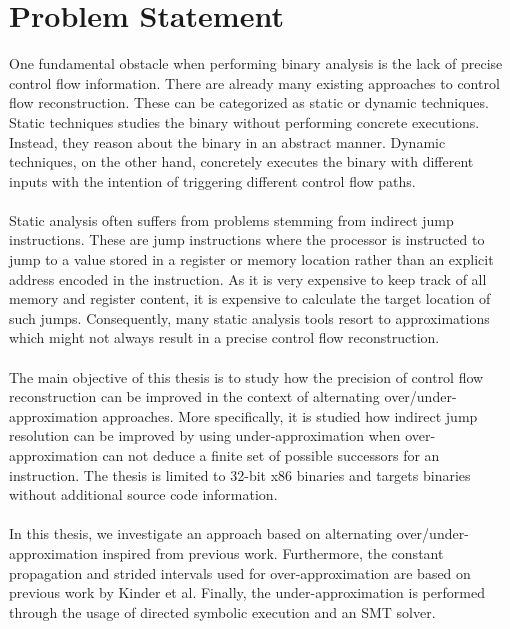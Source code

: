 \documentclass{kththesis}
\begin{document}
\section{Problem Statement}
One fundamental obstacle when performing binary analysis is the lack of precise control flow information. There are already many existing approaches to control flow reconstruction. These can be categorized as static or dynamic techniques. Static techniques studies the binary without performing concrete executions. Instead, they reason about the binary in an abstract manner. Dynamic techniques, on the other hand, concretely executes the binary with different inputs with the intention of triggering different control flow paths. 
\\ \\ 
Static analysis often suffers from problems stemming from indirect jump instructions. These are jump instructions where the processor is instructed to jump to a value stored in a register or memory location rather than an explicit address encoded in the instruction. As it is very expensive to keep track of all memory and register content, it is expensive to calculate the target location of such jumps. Consequently, many static analysis tools resort to approximations which might not always result in a precise control flow reconstruction.
\\ \\
The main objective of this thesis is to study how the precision of control flow reconstruction can be improved in the context of alternating over/under-approximation approaches. More specifically, it is studied how indirect jump resolution can be improved by using under-approximation when over-approximation can not deduce a finite set of possible successors for an instruction. The thesis is limited to 32-bit x86 binaries and targets binaries without additional source code information.
\\ \\
In this thesis, we investigate an approach based on alternating over/under-approximation inspired from previous work\cite{alternating}. Furthermore, the constant propagation and strided intervals used for over-approximation are based on previous work by Kinder et al\cite{Jakstab}. Finally, the under-approximation is performed through the usage of directed symbolic execution and an SMT solver. 
\end{document}
